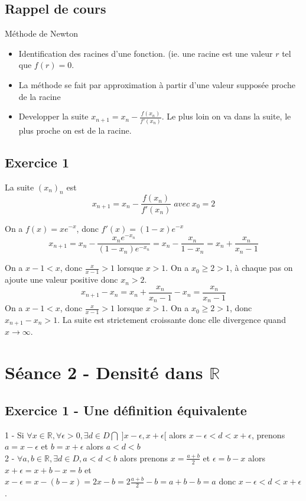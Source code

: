 \documentclass[]{book}
\theoremstyle{definition}
\newcommand{\bb}[1]{\mathbb{#1}}
\newcommand{\R}{\bb{R}}
\begin{document}
\subsection*{Rappel de cours}

M\'ethode de Newton

\begin{itemize}
\item Identification des racines d'une fonction. (ie. une racine est une valeur $r$ tel que $f(r)=0$.
\item La m\'ethode se fait par approximation \`a partir d'une valeur suppos\'ee proche de la racine
\item Developper la suite $x_{n+1} = x_n - \frac{f(x_n)}{f'(x_n)}$. Le plus loin on va dans la suite, le plus proche on est de la racine.
\end{itemize}


\subsection*{Exercice 1}

La suite $(x_n)_n$ est 
$$x_{n+1} = x_n - \frac{f(x_n)}{f'(x_n)}\; avec\; x_0 = 2$$

On a $f(x) = xe^{-x}$, donc $f'(x) = (1-x)e^{-x}$
$$x_{n+1} = x_n - \frac{x_ne^{-x_n}}{(1-x_n)e^{-x_n}} = x_n - \frac{x_n}{1-x_n} = x_n + \frac{x_n}{x_n-1}$$

On a $x-1 < x$, donc $\frac{x}{x-1} > 1$ lorsque $x > 1$. On a $x_0 \geq 2 > 1$, \`a chaque pas on ajoute une valeur positive donc $x_n>2$.\\

$$x_{n+1} - x_{n} = x_n + \frac{x_n}{x_n-1} - x_n = \frac{x_n}{x_n-1}$$
On a $x-1 < x$, donc $\frac{x}{x-1} > 1$ lorsque $x > 1$. On a $x_0 \geq 2 > 1$, donc $x_{n+1} - x_{n} > 1$. La suite est strictement croissante donc elle divergence quand $x \to \infty$.

\newpage
\section*{S\'eance 2 - Densit\'e dans $\R$}

\subsection*{Exercice 1 -  Une d\'efinition \'equivalente}

1 - Si $\forall x \in \R, \forall \epsilon > 0, \exists d \in D \bigcap\; ]x-\epsilon,x+\epsilon[$ alors $x-\epsilon < d < x+\epsilon$, prenons $a=x-\epsilon$ et $b=x+\epsilon$ alors $a<d<b$\\
2 - $\forall a,b \in \R, \exists d \in D, a < d < b$ alors prenons $x=\frac{a+b}{2}$ et $\epsilon = b-x$ alors $x+\epsilon = x + b-x = b$ et $x-\epsilon = x - (b-x) = 2x - b = 2\frac{a+b}{2} -b = a+b-b = a$ donc $x-\epsilon < d < x+\epsilon$.
\end{document}
